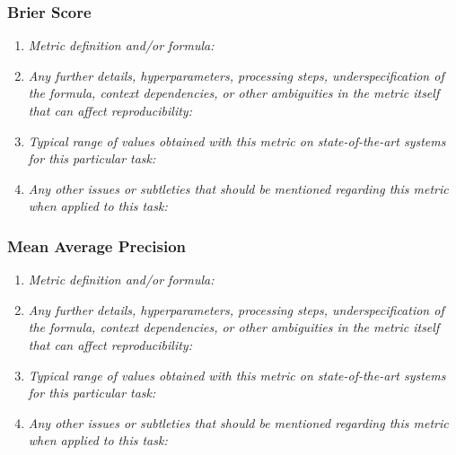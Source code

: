 \documentclass[a4paper,11pt]{article}
\begin{document}
        \subsubsection{Brier Score}
            \begin{enumerate}[label=\alph*.]
                \item \textit{Metric definition and/or formula:}
                \bigskip
                \item \textit{Any further details, hyperparameters, processing steps, underspecification of the formula, context dependencies, or other ambiguities in the metric itself that can affect reproducibility:}
                \bigskip
                \item \textit{Typical range of values obtained with this metric on state-of-the-art systems for this particular task:}
                \bigskip
                \item \textit{Any other issues or subtleties that should be mentioned regarding this metric when applied to this task:}
                \bigskip
            \end{enumerate}
        \subsubsection{Mean Average Precision}
            \begin{enumerate}[label=\alph*.]
                \item \textit{Metric definition and/or formula:}
                \bigskip
                \item \textit{Any further details, hyperparameters, processing steps, underspecification of the formula, context dependencies, or other ambiguities in the metric itself that can affect reproducibility:}
                \bigskip
                \item \textit{Typical range of values obtained with this metric on state-of-the-art systems for this particular task:}
                \bigskip
                \item \textit{Any other issues or subtleties that should be mentioned regarding this metric when applied to this task:}
                \bigskip
            \end{enumerate}
\end{document}
